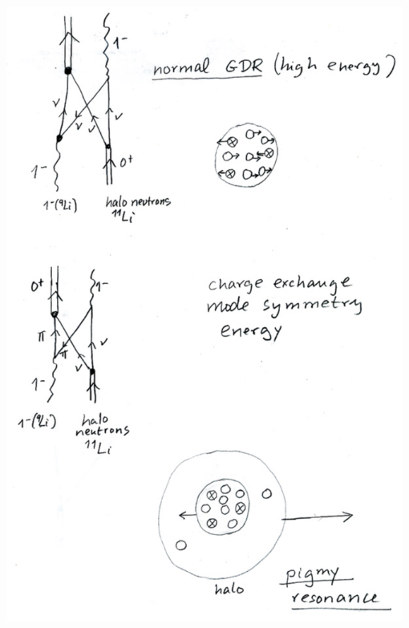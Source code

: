 \documentclass[a4paper,onecolumn,superscriptaddress,12pt,nofootinbib,twoside,raggedfooter,notitlepage]{revtex4-1}
\begin{document}
\begin{center}
	\includegraphics[width=0.98\textwidth]{figs/fig_c3}
\end{center}
\end{document}
